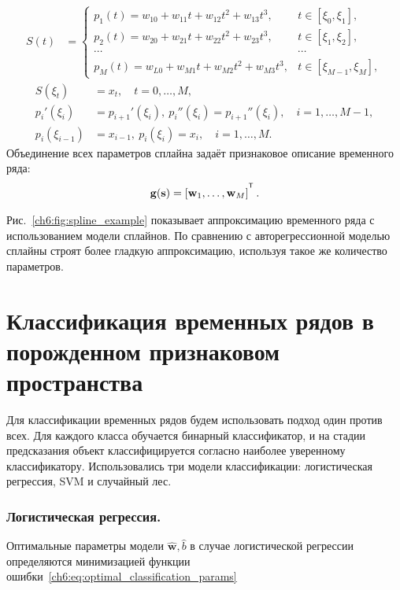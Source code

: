 \begin{align*}
	S(t) &= \begin{cases}
		p_1(t) = w_{10} +w_{11}t + w_{12}t^2 + w_{13}t^3, & t\in [\xi_0, \xi_1],\\
		p_2(t) = w_{20} +w_{21}t + w_{22}t^2 + w_{23}t^3, & t\in [\xi_1, \xi_2],\\
		\cdots&\cdots \\
		p_{M}(t) = w_{L0} +w_{M1}t + w_{M2}t^2 + w_{M3}t^3, & t\in [\xi_{M-1}, \xi_M],					
	\end{cases}
\end{align*}
\begin{align*}
	S(\xi_t) &= x_t, \quad t = 0, \dots, M,\\
	p_i'(\xi_i) &= p_{i+1}'(\xi_i),\: p_i''(\xi_i) = p_{i+1}''(\xi_i), \quad i = 1, \dots, M-1,\\
	p_i(\xi_{i-1}) &= x_{i-1},\: p_i(\xi_i) = x_i, \quad i = 1, \dots, M.
\end{align*}
Объединение всех параметров сплайна задаёт признаковое описание временного ряда:
\[
	\mathbf{g}(\bs) = \left[\mathbf{w}_1, \dots, \mathbf{w}_{M}\right]^{\T}.
\]

Рис.~\ref{ch6:fig:spline_example} показывает аппроксимацию временного ряда с использованием модели сплайнов.
По сравнению с авторегрессионной моделью сплайны строят более гладкую аппроксимацию, используя такое же количество параметров.

\section{Классификация временных рядов в порожденном признаковом пространства}
\label{sec:ch6:feature_generation_classification}

Для классификации временных рядов будем использовать подход один против всех. 
Для каждого класса обучается бинарный классификатор, и на стадии предсказания объект классифицируется согласно наиболее уверенному классификатору.
Использовались три модели классификации: логистическая регрессия, SVM и случайный лес.

\subsubsection{Логистическая регрессия.}
Оптимальные параметры модели $\hat{\mathbf{w}}, \hat{b}$  в случае логистической регрессии определяются минимизацией функции ошибки~\eqref{ch6:eq:optimal_classification_params}


